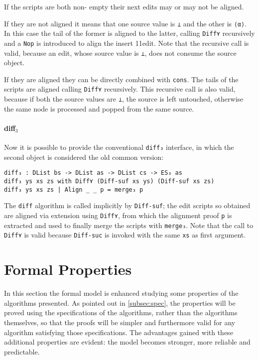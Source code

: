 \documentclass[../Thesis.tex]{subfiles}
\begin{document}
	If the scripts are both non-	empty their next edits may or may not
	be aligned. 
	
	If they are not aligned it means that one source
	value is \texttt{⊥} and the other is \texttt{⟨α⟩}. In this case
	the tail of the former is aligned to the latter, calling \texttt{Diff⋎} 
	recursively and a \texttt{Nop} is introduced to align the insert 11edit.
	Note that the recursive call is valid, because an edit, whose
	source value is \texttt{⊥}, does not consume the source object.

	If they are aligned they can be directly combined with \texttt{cons}.
	The tails of the scripts are aligned calling \texttt{Diff⋎} recursively.
	This recursive call is also valid, because if both the source values are
	\texttt{⊥}, the source is left untouched, otherwise the same node
	is processed and popped from the same source.	

	\paragraph{diff$_3$}
	Now it is possible to provide the conventional \texttt{diff₃} interface, in
	which the second object is considered the old common version:
\begin{verbatim}
diff₃ : DList bs -> DList as -> DList cs -> ES₃ as
diff₃ ys xs zs with Diff⋎ (Diff-suf xs ys) (Diff-suf xs zs)
diff₃ ys xs zs | Align _ _ p = merge₃ p
\end{verbatim}
	
	The \texttt{diff} algorithm is called implicitly by \texttt{Diff-suf}; the
	edit scripts so obtained are aligned via extension using 
	\texttt{Diff⋎}, from which the alignment proof \texttt{p} is extracted
	and used to finally merge the scripts with \texttt{merge₃}.
	Note that the call to \texttt{Diff⋎} is valid because \texttt{Diff-suc}
	is invoked with the same \texttt{xs} as first argument.
	
\section{Formal Properties}
In this section the formal model is enhanced studying some properties of the algorithms presented. As pointed out in \ref{subsec:spec}, the 
properties will be proved using the specifications of the algorithms, rather
than the algorithms themselves, so that the proofs will be simpler and 
furthermore valid for any algorithm satisfying those specifications.
The advantages gained with these additional properties
are evident: the model becomes stronger, more reliable and predictable.
\end{document}
